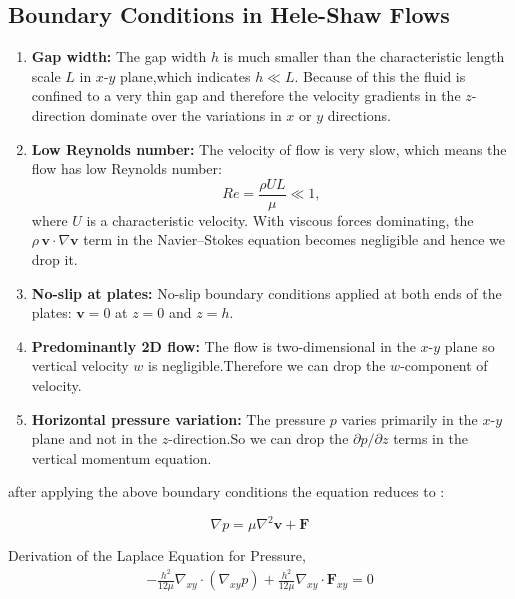 \documentclass[12pt,a4paper]{article}
\begin{document}
\subsection{Boundary Conditions in Hele-Shaw Flows}
\begin{enumerate}
  \item \textbf{Gap width:} The gap width \(h\) is much smaller than the characteristic length scale \(L\) in \(x\)-\(y\) plane,which indicates \(h \ll L\). Because of this the fluid is confined to a very thin gap and therefore the velocity gradients in the \(z\)-direction dominate over the variations in \(x\) or \(y\) directions.

  \item \textbf{Low Reynolds number:} The velocity of flow is very slow, which means the flow has low Reynolds number: 
    \[
      Re = \frac{\rho U L}{\mu} \ll 1,
    \]
    where \(U\) is a characteristic velocity. With viscous forces dominating, the  \\ 
    \(\rho\,\mathbf{v}\cdot\nabla\mathbf{v}\) term in the Navier–Stokes equation becomes negligible and hence we drop it.

  \item \textbf{No-slip at plates:} No-slip boundary conditions applied at both ends of the plates: \(\mathbf{v} = 0\) at \(z = 0\) and \(z = h\).

  \item \textbf{Predominantly 2D flow:} The flow is  two-dimensional in the \(x\)-\(y\) plane so vertical velocity \(w\) is negligible.Therefore we can drop the \(w\)-component of velocity.

  \item \textbf{Horizontal pressure variation:} The pressure \(p\) varies primarily in the \(x\)-\(y\) plane and not in the \(z\)-direction.So we can drop the \(\partial p / \partial z\) terms in the vertical momentum equation.
\end{enumerate}

after applying the above boundary conditions the equation reduces to : 

\[
\boxed{
    \nabla p = \mu \nabla^2 \mathbf{v} + \mathbf{F}
}
\]




Derivation of the Laplace Equation for Pressure,
\begin{align}
    -\frac{h^2}{12\mu}\nabla_{xy} \cdot (\nabla_{xy} p) + \frac{h^2}{12\mu}\nabla_{xy} \cdot \mathbf{F}_{xy} = 0
\end{align}
\end{document}
